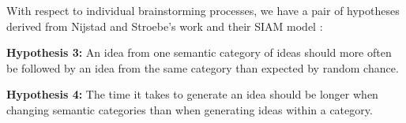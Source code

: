 
With respect to individual brainstorming processes, we have a pair of hypotheses derived from Nijstad and Stroebe's work and their SIAM model \cite{nijstad_how_2006}:

\textbf{Hypothesis 3:} An idea from one semantic category of ideas should more often be followed by an idea from the same category than expected by random chance.

\textbf{Hypothesis 4:} The time it takes to generate an idea should be longer when changing semantic categories than when generating ideas within a category.


